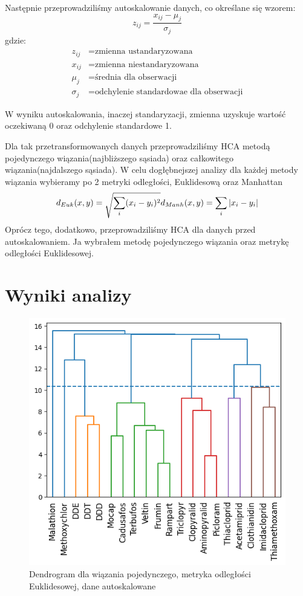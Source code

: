 \documentclass[12pt, a4paper]{article}
\begin{document}
    Następnie przeprowadziliśmy autoskalowanie danych, co określane się wzorem:
    \begin{equation}
        z_{ij} = \frac{x_{ij} - \mu_j}{\sigma_j}
    \end{equation}
    gdzie:
    \begin{align*}
        z_{ij} &= \text{zmienna ustandaryzowana}\\
        x_{ij} &= \text{zmienna niestandaryzowana}\\
        \mu_j &= \text{średnia dla obserwacji}\\
        \sigma_j &= \text{odchylenie standardowae dla obserwacji}
    \end{align*}

    W wyniku autoskalowania, inaczej standaryzacji, zmienna uzyskuje wartość oczekiwaną 0 oraz odchylenie standardowe 1.

    Dla tak przetransformowanych danych przeprowadziliśmy HCA metodą pojedynczego wiązania(najbliższego sąsiada)
    oraz całkowitego wiązania(najdalszego sąsiada).
    W celu dogłębnejszej analizy dla każdej metody wiązania wybieramy po 2 metryki odległości, Euklidesową oraz Manhattan
    \begin{equation}
        d_{Euk}(x,y) = \sqrt{\sum_i (x_i - y_i)^2}\\
        d_{Manh}(x,y) = \sum_i |x_i - y_i|
    \end{equation}
    Oprócz tego, dodatkowo, przeprowadziliśmy HCA dla danych przed autoskalowaniem. Ja wybrałem metodę pojedynczego wiązania oraz metrykę odległości Euklidesowej.

\section{Wyniki analizy}

    \begin{figure}[H]
        \centering
        \includegraphics{wp_Euk.png}
        \caption{Dendrogram dla wiązania pojedynczego, metryka odległości Euklidesowej, dane autoskalowane}
    \end{figure}
\end{document}
